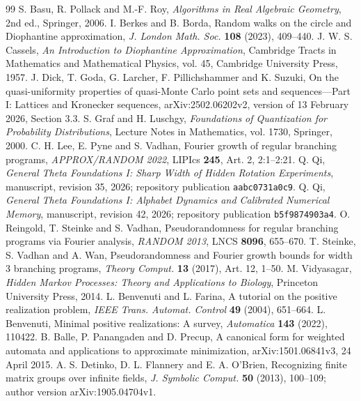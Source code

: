 \begin{thebibliography}{99}
 S. Basu, R. Pollack and M.-F. Roy,
\emph{Algorithms in Real Algebraic Geometry}, 2nd ed., Springer, 2006.
 I. Berkes and B. Borda,
Random walks on the circle and Diophantine approximation,
\emph{J. London Math. Soc.} \textbf{108} (2023), 409--440.
 J. W. S. Cassels,
\emph{An Introduction to Diophantine Approximation}, Cambridge Tracts in Mathematics and Mathematical Physics, vol. 45, Cambridge University Press, 1957.
 J. Dick, T. Goda, G. Larcher, F. Pillichshammer and K. Suzuki,
On the quasi-uniformity properties of quasi-Monte Carlo point sets and sequences---Part I: Lattices and Kronecker sequences,
arXiv:2502.06202v2, version of 13 February 2026, Section 3.3.
 S. Graf and H. Luschgy,
\emph{Foundations of Quantization for Probability Distributions}, Lecture Notes in Mathematics, vol. 1730, Springer, 2000.
 C. H. Lee, E. Pyne and S. Vadhan,
Fourier growth of regular branching programs,
\emph{APPROX/RANDOM 2022}, LIPIcs \textbf{245}, Art. 2, 2:1--2:21.
 Q. Qi,
\emph{General Theta Foundations I: Sharp Width of Hidden Rotation Experiments}, manuscript, revision 35, 2026; repository publication \texttt{aabc0731a0c9}.
 Q. Qi,
\emph{General Theta Foundations I: Alphabet Dynamics and Calibrated Numerical Memory}, manuscript, revision 42, 2026; repository publication \texttt{b5f9874903a4}.
 O. Reingold, T. Steinke and S. Vadhan,
Pseudorandomness for regular branching programs via Fourier analysis,
\emph{RANDOM 2013}, LNCS \textbf{8096}, 655--670.
 T. Steinke, S. Vadhan and A. Wan,
Pseudorandomness and Fourier growth bounds for width 3 branching programs,
\emph{Theory Comput.} \textbf{13} (2017), Art. 12, 1--50.
 M. Vidyasagar,
\emph{Hidden Markov Processes: Theory and Applications to Biology}, Princeton University Press, 2014.
 L. Benvenuti and L. Farina,
A tutorial on the positive realization problem,
\emph{IEEE Trans. Automat. Control} \textbf{49} (2004), 651--664.
 L. Benvenuti,
Minimal positive realizations: A survey,
\emph{Automatica} \textbf{143} (2022), 110422.
 B. Balle, P. Panangaden and D. Precup,
A canonical form for weighted automata and applications to approximate minimization,
arXiv:1501.06841v3, 24 April 2015.
 A. S. Detinko, D. L. Flannery and E. A. O'Brien,
Recognizing finite matrix groups over infinite fields,
\emph{J. Symbolic Comput.} \textbf{50} (2013), 100--109; author version arXiv:1905.04704v1.

\end{thebibliography}
